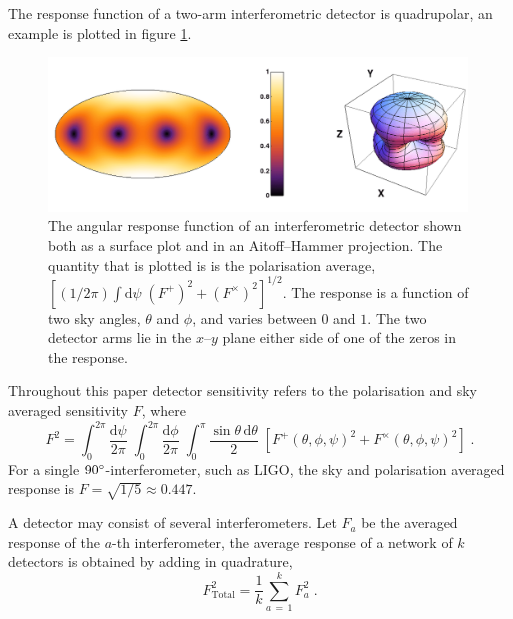 The response function of a two-arm interferometric detector is quadrupolar, an example is plotted in figure \ref{fig:LIGO}.
\begin{figure}
 \centering
 \includegraphics[trim=0cm 0cm 0cm 0cm, width=0.99\textwidth]{LIGO_detectorframe.pdf}
 \caption{The angular response function of an interferometric detector shown both as a surface plot and in an Aitoff--Hammer projection. The quantity that is plotted is is the polarisation average, $\left[(1/2\pi)\int\mathrm{d}\psi \;(F^{+})^{2}+(F^{\times})^{2}\right]^{1/2}$. The response is a function of two sky angles, $\theta$ and $\phi$, and varies between $0$ and $1$. The two detector arms lie in the $x$--$y$ plane either side of one of the zeros in the response.}
 \label{fig:LIGO}
\end{figure}
Throughout this paper detector sensitivity refers to the polarisation and sky averaged sensitivity $F$, where
\begin{equation}\label{eq:skyav}
F^{2}=\int_{0}^{2\pi}\frac{\mathrm{d}\psi}{2\pi}\; \int_{0}^{2\pi} \frac{\mathrm{d}\phi}{2\pi}\; \int_{0}^{\pi}\frac{\sin\theta\,\mathrm{d}\theta}{2}\;\left[F^{+}\left(\theta,\phi,\psi\right)^{2}+F^{\times}\left(\theta,\phi,\psi\right)^{2}\right]\; .
\end{equation}
For a single $90^\circ$-interferometer, such as LIGO, the sky and polarisation averaged response is $F=\sqrt{1/5}\approx 0.447$.

A detector may consist of several interferometers. Let $F_{a}$ be the averaged response of the $a$-th interferometer, the average response of a network of $k$ detectors is obtained by adding in quadrature,
\begin{equation} F_{\mathrm{Total}}^{2}=\frac{1}{k}\sum_{a\,=\,1}^{k}F_{a}^{2} \; .\end{equation}

